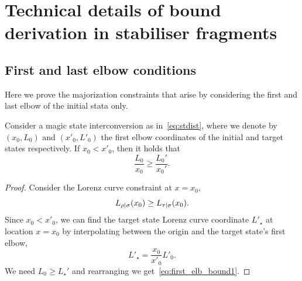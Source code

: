 
\section{Technical details of bound derivation in stabiliser fragments}
\label{app:lcst_technical}

\subsection{First and last elbow conditions}
\label{app:elb_constraints}
Here we prove the majorization constraints that arise by considering the first and last elbow of the initial stata only.
\begin{proposition}\label{prop:first_elb}
	Consider a magic state interconversion as in~\cref{eq:stdist}, where we denote by $(x_0, L_0)$ and $(x'_0, L'_0)$ the first elbow coordinates of the initial and target states respectively.
	If $x_0 < x'_0$, then it holds that
\begin{equation}\label{eq:first_elb_bound1}
	\frac{L_0}{x_0} \geq \frac{L_0'}{x_0'}.
\end{equation}
\end{proposition}
\begin{proof}
	Consider the Lorenz curve constraint at $x = x_0$,
\begin{equation}
	{L_{\rho|\sigma}}(x_0) \geq {L_{\tau|\sigma}}(x_0).
\end{equation}
Since $x_0 < x'_0$, we can find the target state Lorenz curve coordinate $L'_\star$ at location $x = x_0$ by interpolating between the origin and the target state's first elbow, 
\begin{equation}
	L'_\star = \frac{x_0}{x'_0}L'_0.
\end{equation}
We need $L_0 \geq L_\star'$ and rearranging we get~\cref{eq:first_elb_bound1}.
\end{proof}

